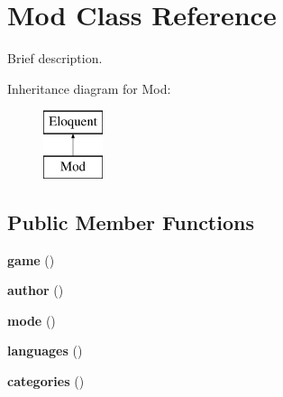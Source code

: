 \hypertarget{class_mod}{}\section{Mod Class Reference}
\label{class_mod}


Brief description.  


Inheritance diagram for Mod\+:\begin{figure}[H]
\begin{center}
\leavevmode
\includegraphics[height=2.000000cm]{class_mod}
\end{center}
\end{figure}
\subsection*{Public Member Functions}
\begin{DoxyCompactItemize}
\item 
\hypertarget{class_mod_ad74f7538285e78bfe0756d77ef389653}{}{\bfseries game} ()\label{class_mod_ad74f7538285e78bfe0756d77ef389653}

\item 
\hypertarget{class_mod_ab490360032884b71d2c89b361ea1ab07}{}{\bfseries author} ()\label{class_mod_ab490360032884b71d2c89b361ea1ab07}

\item 
\hypertarget{class_mod_a0da531fc30bdf883d86d4219c3c54e07}{}{\bfseries mode} ()\label{class_mod_a0da531fc30bdf883d86d4219c3c54e07}

\item 
\hypertarget{class_mod_adda8fc15b6fe0efc05a50d2645189c77}{}{\bfseries languages} ()\label{class_mod_adda8fc15b6fe0efc05a50d2645189c77}

\item 
\hypertarget{class_mod_a387bdb0e925ab2459d5ede3b5cb1a98e}{}{\bfseries categories} ()\label{class_mod_a387bdb0e925ab2459d5ede3b5cb1a98e}

\end{DoxyCompactItemize}
